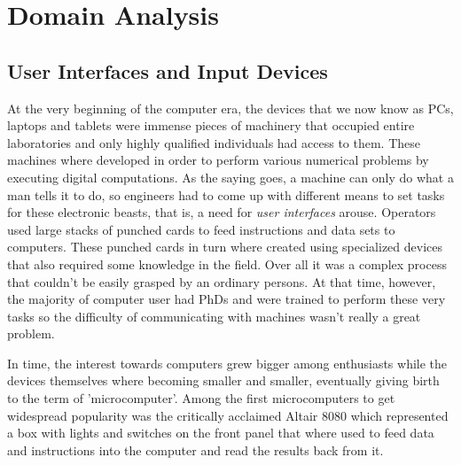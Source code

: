 \section{Domain Analysis}



\subsection{User Interfaces and Input Devices}


At the very beginning of the computer era, the devices that we now know as
PCs, laptops and tablets were immense pieces of machinery that occupied entire
laboratories and only highly qualified individuals had access to them. These
machines where developed in order to perform various numerical problems by
executing digital computations. As the saying goes, a machine can only do what
a man tells it to do, so engineers had to come up with different means to set
tasks for these electronic beasts, that is, a need for \emph{user interfaces}
arouse. Operators used large stacks of punched cards to feed instructions and
data sets to computers. These punched cards in turn where created using
specialized devices that also required some knowledge in the field. Over all
it was a complex process that couldn't be easily grasped by an ordinary
persons. At that time, however, the majority of computer user had PhDs and
were trained to perform these very tasks so the difficulty of communicating
with machines wasn't really a great problem.


In time, the interest towards computers grew bigger among enthusiasts while
the devices themselves where becoming smaller and smaller, eventually giving
birth to the term of 'microcomputer'. Among the first microcomputers to get
widespread popularity was the critically acclaimed Altair 8080 which
represented a box with lights and switches on the front panel that where used
to feed data and instructions into the computer and read the results back from
it.

